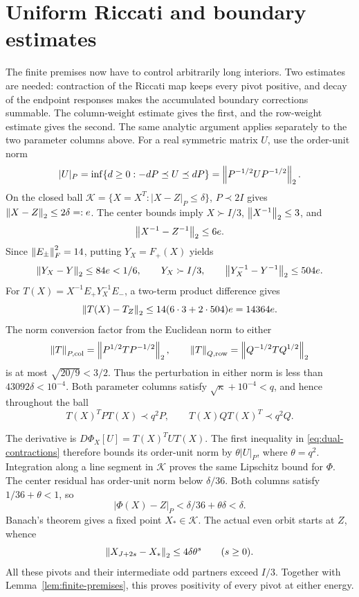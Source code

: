 \section{Uniform Riccati and boundary estimates}
\label{sec:uniform}

The finite premises now have to control arbitrarily long interiors.
Two estimates are needed: contraction of the Riccati map keeps every
pivot positive, and decay of the endpoint responses makes the accumulated
boundary corrections summable. The column-weight estimate gives the
first, and the row-weight estimate gives the second. The same analytic
argument applies separately to the two parameter columns above.
For a real symmetric matrix $U$, use the order-unit norm
\[
 |U|_P=\inf\{d\ge0:-dP\preceq U\preceq dP\}
      =\left\lVert P^{-1/2}UP^{-1/2}\right\rVert_2.
\]
On the closed ball $\mathcal K=\{X=X^T:|X-Z|_P\le\delta\}$,
$P\prec2I$ gives $\left\lVert X-Z\right\rVert_2\le2\delta=:e$.
The center bounds imply $X\succ I/3$, $\left\lVert X^{-1}\right\rVert_2\le3$, and
\[
 \left\lVert X^{-1}-Z^{-1}\right\rVert_2\le6e.
\]
Since $\left\lVert E_\pm\right\rVert_F^2=14$, putting $Y_X=F_+(X)$ yields
\[
 \left\lVert Y_X-Y\right\rVert_2\le84e<1/6,\qquad
 Y_X\succ I/3,\qquad
 \left\lVert Y_X^{-1}-Y^{-1}\right\rVert_2\le504e.
\]
For $T(X)=X^{-1}E_+Y_X^{-1}E_-$, a two-term product difference gives
\begin{equation}
 \left\lVert T(X)-T_Z\right\rVert_2\le14(6\cdot3+2\cdot504)e=14364e.
 \label{eq:Tperturb}
\end{equation}
The norm conversion factor from the Euclidean norm to either
\[
 \left\lVert T\right\rVert_{P,\mathrm{col}}=\left\lVert P^{1/2}TP^{-1/2}\right\rVert_2,
 \qquad
 \left\lVert T\right\rVert_{Q,\mathrm{row}}=\left\lVert Q^{-1/2}TQ^{1/2}\right\rVert_2
\]
is at most $\sqrt{20/9}<3/2$. Thus the perturbation in either norm is
less than $43092\delta<10^{-4}$. Both parameter columns satisfy
$\sqrt\kappa+10^{-4}<q$, and hence throughout the ball
\begin{equation}
 T(X)^TPT(X)\prec q^2P,\qquad T(X)QT(X)^T\prec q^2Q.
 \label{eq:dual-contractions}
\end{equation}

The derivative is $D\Phi_X[U]=T(X)^TUT(X)$. The first inequality in
\eqref{eq:dual-contractions} therefore bounds its order-unit norm by
$\theta|U|_P$, where $\theta=q^2$. Integration along a line segment in
$\mathcal K$ proves the same Lipschitz bound for $\Phi$. The center
residual has order-unit norm below $\delta/36$. Both columns satisfy
$1/36+\theta<1$, so
\[
 |\Phi(X)-Z|_P<\delta/36+\theta\delta<\delta.
\]
Banach's theorem gives a fixed point $X_*\in\mathcal K$. The actual
even orbit starts at $Z$, whence
\begin{equation}
 \left\lVert X_{J+2s}-X_*\right\rVert_2\le4\delta\theta^s\qquad(s\ge0).
 \label{eq:pivot-decay}
\end{equation}
All these pivots and their intermediate odd partners exceed $I/3$.
Together with Lemma~\ref{lem:finite-premises}, this proves positivity of
every pivot at either energy.

